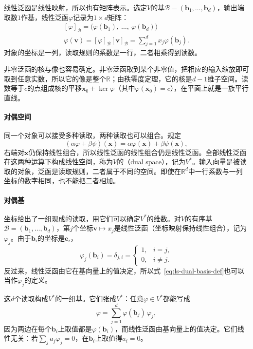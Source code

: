线性泛函是线性映射，所以也有矩阵表示。选定$V$的基$\mathcal B=(\bm b_1,\ldots,\bm b_d)$，输出端取数$1$作基，线性泛函$\varphi$记录为$1\times d$矩阵：
\[
 \begin{gathered}
[\varphi]_{\mathcal B}=\bigl(\varphi(\bm b_1),\ \ldots,\ \varphi(\bm b_d)\bigr)\\
\varphi(\bm v)=[\varphi]_{\mathcal B}[\bm v]_{\mathcal B}=\sum_{j=1}^dx_j\varphi(\bm b_j).
 \end{gathered}
\]
对象的坐标是一列，读取规则的系数是一行，二者相乘得到读数。

非零泛函的核与像也容易确定。非零泛函取到某个非零值，把相应的输入缩放即可取到任意实数，所以它的像是整个$\mathbb R$；由秩零度定理，它的核是$d-1$维子空间。读数等于$c$的点组成核的平移$\bm x_0+\ker\varphi$（其中$\varphi(\bm x_0)=c$），在平面上就是一族平行直线。

\paragraph{对偶空间}
同一个对象可以接受多种读取，两种读取也可以组合。规定
\[
 (\alpha\varphi+\beta\psi)(\bm x)=\alpha\varphi(\bm x)+\beta\psi(\bm x),
\]
右端对$\bm x$仍保持线性组合，所以线性泛函的线性组合仍是线性泛函。全部线性泛函在这两种运算下构成线性空间，称为$V$的（dual space），记为$V^*$。输入向量是被读取的对象，泛函是读取规则，二者属于不同的空间。即使在$\mathbb R^d$中一行系数与一列坐标的数字相同，也不能把二者相加。

\paragraph{对偶基}
坐标给出了一组现成的读取，用它们可以确定$V^*$的维数。对$V$的有序基$\mathcal B=(\bm b_1,\ldots,\bm b_d)$，第$j$个坐标$\bm v\mapsto x_j$是线性泛函（坐标映射保持线性组合），记为$\varphi_j$。由于$\bm b_i$的坐标是$\bm e_i$，
\begin{equation}
 \varphi_j(\bm b_i)=\delta_{j,i}
 =\begin{cases}1,&i=j,\\0,&i\neq j.\end{cases}
 \label{eq:ls-dual-basis-def}
\end{equation}
反过来，线性泛函由它在基向量上的值决定，所以式~\eqref{eq:ls-dual-basis-def}也可以当作$\varphi_j$的定义。

这$d$个读取构成$V^*$的一组基。它们张成$V^*$：任意$\varphi\in V^*$都能写成
\[
 \varphi=\sum_{j=1}^d\varphi(\bm b_j)\,\varphi_j,
\]
因为两边在每个$\bm b_i$上取值都是$\varphi(\bm b_i)$，而线性泛函由基向量上的值决定。它们线性无关：若$\sum_ja_j\varphi_j=0$，在$\bm b_i$上取值得$a_i=0$。


